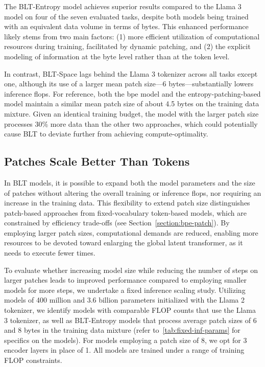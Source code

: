 The {\textsc BLT}-Entropy model achieves superior results compared to the Llama 3 model on four of the seven evaluated tasks, despite both models being trained with an equivalent data volume in terms of bytes. This enhanced performance likely stems from two main factors: (1) more efficient utilization of computational resources during training, facilitated by dynamic patching, and (2) the explicit modeling of information at the byte level rather than at the token level.

In contrast, {\textsc BLT}-Space lags behind the Llama 3 tokenizer across all tasks except one, although its use of a larger mean patch size—6 bytes—substantially lowers inference flops. For reference, both the bpe model and the entropy-patching-based model maintain a similar mean patch size of about 4.5 bytes on the training data mixture. Given an identical training budget, the model with the larger patch size processes 30\% more data than the other two approaches, which could potentially cause {\textsc BLT} to deviate further from achieving compute-optimality.

\subsection{Patches Scale Better Than Tokens} In {\textsc BLT} models, it is possible to expand both the model parameters and the size of patches without altering the overall training or inference flops, nor requiring an increase in the training data. This flexibility to extend patch size distinguishes patch-based approaches from fixed-vocabulary token-based models, which are constrained by efficiency trade-offs (see Section~\ref{section:bpe-patch}). By employing larger patch sizes, computational demands are reduced, enabling more resources to be devoted toward enlarging the global latent transformer, as it needs to execute fewer times.

To evaluate whether increasing model size while reducing the number of steps on larger patches leads to improved performance compared to employing smaller models for more steps, we undertake a fixed inference scaling study. Utilizing models of 400 million and 3.6 billion parameters initialized with the Llama 2 tokenizer, we identify models with comparable FLOP counts that use the Llama 3 tokenizer, as well as {\textsc BLT}-Entropy models that process average patch sizes of 6 and 8 bytes in the training data mixture (refer to~\autoref{tab:fixed-inf-params} for specifics on the models). For models employing a patch size of 8, we opt for 3 encoder layers in place of 1. All models are trained under a range of training FLOP constraints.

